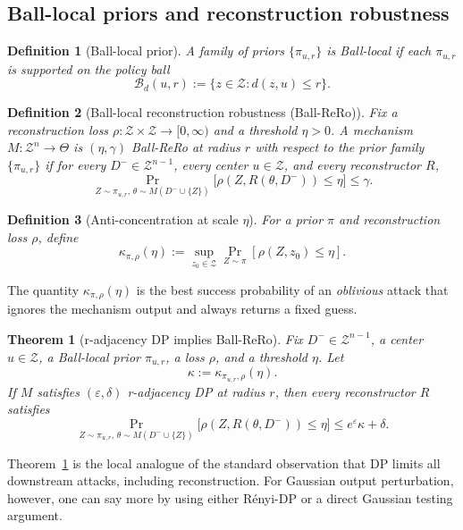 \documentclass[conference,compsoc]{IEEEtran}
\newtheorem{definition}{Definition}
\newtheorem{theorem}{Theorem}
\newcommand{\ball}[2]{\mathcal{B}_{#1}(#2)}
\begin{document}
\subsection{Ball-local priors and reconstruction robustness}

\begin{definition}[Ball-local prior]
A family of priors $\{\pi_{u,r}\}$ is \emph{Ball-local} if each $\pi_{u,r}$ is supported on the policy ball
\[
\ball{d}{u,r}:=\{z\in\mathcal{Z}: d(z,u)\le r\}.
\]
\end{definition}

\begin{definition}[Ball-local reconstruction robustness (Ball-ReRo)]
\label{def:ball-rero}
Fix a reconstruction loss $\rho:\mathcal{Z}\times\mathcal{Z}\to[0,\infty)$ and a threshold $\eta>0$. A mechanism $M:\mathcal{Z}^n\to\Theta$ is \emph{$(\eta,\gamma)$ Ball-ReRo at radius $r$} with respect to the prior family $\{\pi_{u,r}\}$ if for every $D^-\in\mathcal{Z}^{n-1}$, every center $u\in\mathcal{Z}$, and every reconstructor $R$,
\[
\Pr_{Z\sim\pi_{u,r},\,\theta\sim M(D^-\cup\{Z\})}
\big[\rho(Z,R(\theta,D^-))\le \eta\big]
\le \gamma.
\]
\end{definition}

\begin{definition}[Anti-concentration at scale $\eta$]
\label{def:kappa}
For a prior $\pi$ and reconstruction loss $\rho$, define
\[
\kappa_{\pi,\rho}(\eta)
:=
\sup_{z_0\in\mathcal{Z}}
\Pr_{Z\sim\pi}[\rho(Z,z_0)\le \eta].
\]
\end{definition}

The quantity $\kappa_{\pi,\rho}(\eta)$ is the best success probability of an \emph{oblivious} attack that ignores the mechanism output and always returns a fixed guess.

\begin{theorem}[r-adjacency DP implies Ball-ReRo]
\label{thm:ball-dp-rero}
Fix $D^-\in\mathcal{Z}^{n-1}$, a center $u\in\mathcal{Z}$, a Ball-local prior $\pi_{u,r}$, a loss $\rho$, and a threshold $\eta$. Let
\[
\kappa:=\kappa_{\pi_{u,r},\rho}(\eta).
\]
If $M$ satisfies $(\varepsilon,\delta)$ r-adjacency DP at radius $r$, then every reconstructor $R$ satisfies
\[
\Pr_{Z\sim\pi_{u,r},\,\theta\sim M(D^-\cup\{Z\})}
\big[\rho(Z,R(\theta,D^-))\le \eta\big]
\le e^{\varepsilon}\kappa+\delta.
\]
\end{theorem}

Theorem~\ref{thm:ball-dp-rero} is the local analogue of the standard observation that DP limits all downstream attacks, including reconstruction. For Gaussian output perturbation, however, one can say more by using either Rényi-DP or a direct Gaussian testing argument.
\end{document}
